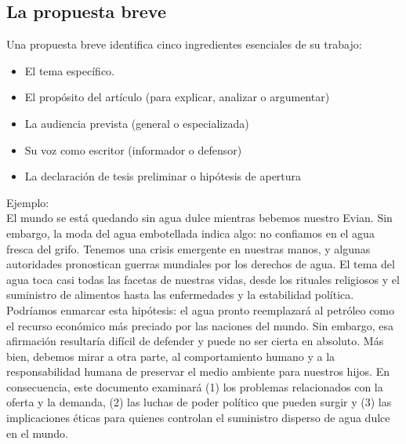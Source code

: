 \subsection{La propuesta breve}
Una propuesta breve identifica cinco ingredientes esenciales de su trabajo:
\begin{itemize}
    \item El tema específico.
    \item El propósito del artículo (para explicar, analizar o argumentar) 
    \item La audiencia prevista (general o especializada) 
    \item Su voz como escritor (informador o defensor) 
    \item La declaración de tesis preliminar o hipótesis de apertura
\end{itemize}
Ejemplo:\\
El mundo se está quedando sin agua dulce mientras bebemos nuestro Evian. Sin embargo, la moda del agua embotellada indica algo: no confiamos en el agua fresca del grifo. Tenemos una crisis emergente en nuestras manos, y algunas autoridades pronostican guerras mundiales por los derechos de agua. El tema del agua toca casi todas las facetas de nuestras vidas, desde los rituales religiosos y el suministro de alimentos hasta las enfermedades y la estabilidad política. Podríamos enmarcar esta hipótesis: el agua pronto reemplazará al petróleo como el recurso económico más preciado por las naciones del mundo. Sin embargo, esa afirmación resultaría difícil de defender y puede no ser cierta en absoluto. Más bien, debemos mirar a otra parte, al comportamiento humano y a la responsabilidad humana de preservar el medio ambiente para nuestros hijos. En consecuencia, este documento examinará (1) los problemas relacionados con la oferta y la demanda, (2) las luchas de poder político que pueden surgir y (3) las implicaciones éticas para quienes controlan el suministro disperso de agua dulce en el mundo.

